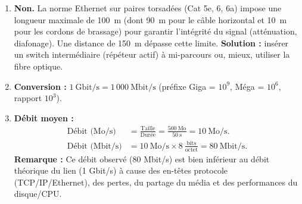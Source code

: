 \documentclass[11pt]{article}
\begin{document}
\begin{corrige}
\begin{enumerate}
  \item \textbf{Non.} La norme Ethernet sur paires torsadées (Cat 5e, 6, 6a) impose une longueur maximale de \SI{100}{m} (dont \SI{90}{m} pour le câble horizontal et \SI{10}{m} pour les cordons de brassage) pour garantir l'intégrité du signal (atténuation, diafonage). Une distance de \SI{150}{m} dépasse cette limite. \textbf{Solution :} insérer un switch intermédiaire (répéteur actif) à mi-parcours ou, mieux, utiliser la fibre optique.
  \item \textbf{Conversion :} $1~\text{Gbit/s} = 1\,000~\text{Mbit/s}$ (préfixe Giga = $10^9$, Méga = $10^6$, rapport $10^3$).
  \item \textbf{Débit moyen :}
  \begin{align*}
    \text{Débit (Mo/s)} &= \frac{\text{Taille}}{\text{Durée}} = \frac{500~\text{Mo}}{50~\text{s}} = 10~\text{Mo/s}. \\
    \text{Débit (Mbit/s)} &= 10~\text{Mo/s} \times 8~\frac{\text{bits}}{\text{octet}} = 80~\text{Mbit/s}.
  \end{align*}
  \textbf{Remarque :} Ce débit observé (80 Mbit/s) est bien inférieur au débit théorique du lien (1 Gbit/s) à cause des en-têtes protocole (TCP/IP/Ethernet), des pertes, du partage du média et des performances du disque/CPU.
\end{enumerate}
\end{corrige}
\end{document}
